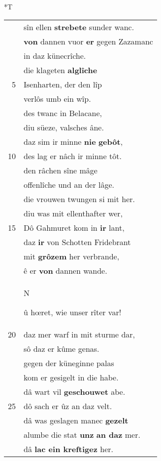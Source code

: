 \documentclass[8pt,a4paper,notitlepage]{article}
\begin{document}
\begin{table}[ht]
\begin{minipage}[t]{0.5\linewidth}
\end{minipage}
\hspace{0.5cm}
\begin{minipage}[t]{0.5\linewidth}
\small
\begin{center}*T
\end{center}
\begin{tabular}{rl}
 & sîn ellen \textbf{strebete} sunder wanc.\\ 
 & \textbf{von} dannen vuor \textbf{er} gegen Zazamanc\\ 
 & in daz künecrîche.\\ 
 & die klageten \textbf{alglîche}\\ 
5 & Isenharten, der den lîp\\ 
 & verlôs umb ein wîp.\\ 
 & des twanc in Belacane,\\ 
 & diu süeze, valsches âne.\\ 
 & daz sim ir minne \textbf{nie} \textbf{gebôt},\\ 
10 & des lag er nâch ir minne tôt.\\ 
 & den râchen sîne mâge\\ 
 & offenlîche und an der lâge.\\ 
 & die vrouwen twungen si mit her.\\ 
 & diu was mit ellenthafter wer,\\ 
15 & Dô Gahmuret kom in \textbf{ir} lant,\\ 
 & daz \textbf{ir} von Schotten Fridebrant\\ 
 & mit \textbf{grôzem} her verbrande,\\ 
 & ê er \textbf{von} dannen wande.\\ 
 & \begin{large}N\end{large}û hœret, wie unser rîter var!\\ 
20 & daz mer warf in mit sturme dar,\\ 
 & sô daz er kûme genas.\\ 
 & gegen der küneginne palas\\ 
 & kom er gesigelt in die habe.\\ 
 & dâ wart  vil \textbf{geschouwet} abe.\\ 
25 & dô sach er ûz an daz velt.\\ 
 & dâ was geslagen manec \textbf{gezelt}\\ 
 & alumbe die stat \textbf{unz} \textbf{an daz} mer.\\ 
 & dâ \textbf{lac ein kreftigez} her.\\ 

\end{tabular}
\end{minipage}
\end{table}
\end{document}
